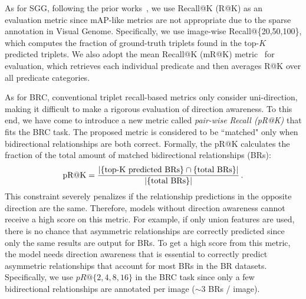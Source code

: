             As for SGG, following the prior works~\cite{xu2017scene, zellers2018neural, yang2018graph}, we use Recall@K (R@K) as an evaluation metric since mAP-like metrics are not appropriate due to the sparse annotation in Visual Genome. Specifically, we use image-wise Recall@\{20,50,100\}, which computes the fraction of ground-truth triplets found in the top-$K$ predicted triplets.
            We also adopt the mean Recall@K (mR@K) metric~\cite{tang2019learning, chen2019knowledge, tang2020unbiased} for evaluation, which retrieves each individual predicate and then averages R@K over all predicate categories.
            
            As for BRC, conventional triplet recall-based metrics only consider uni-direction, making it difficult to make a rigorous evaluation of direction awareness. To this end, we have come to introduce a new metric called \textit{pair-wise Recall (pR@K)} that fits the BRC task. The proposed metric is considered to be ``matched" only when bidirectional relationships are both correct. Formally, the pR@K calculates the fraction of the total amount of matched bidirectional relationships (BRs):
            \begin{eqnarray}
                \begin{aligned}
                    \text{pR@K} = {{|\{\text{top-K predicted BRs}\} \cap \{\text{total BRs}\}|} \over {|\{\text{total BRs}\}|}} \,.
                \end{aligned}
                \label{eq:12}
            \end{eqnarray}
            This constraint severely penalizes if the relationship predictions in the opposite direction are the same. Therefore, models without direction awareness cannot receive a high score on this metric.
            For example, if only union features are used, there is no chance that asymmetric relationships are correctly predicted since only the same results are output for BRs.
            To get a high score from this metric, the model needs direction awareness that is essential to correctly predict asymmetric relationships that account for most BRs in the BR datasets.
            Specifically, we use $pR@\{2,4,8,16\}$ in the BRC task since only a few bidirectional relationships are annotated per image ($\sim$3 BRs / image).
            
